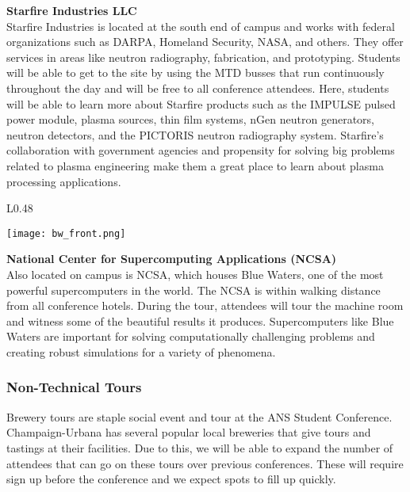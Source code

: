 \clearpage
\textbf{Starfire Industries LLC}\\
Starfire Industries is located at the south end of campus and works with federal organizations such as DARPA, Homeland Security, NASA, and others. They offer services in areas like neutron radiography, fabrication, and prototyping. Students will be able to get to the site by using the MTD busses that run continuously throughout the day and will be free to all conference attendees. Here, students will be able to learn more about Starfire products such as the IMPULSE pulsed power module, plasma sources, thin film systems, nGen neutron generators, neutron detectors, and the PICTORIS neutron radiography system. Starfire’s collaboration with government agencies and propensity for solving big problems related to plasma engineering make them a great place to learn about plasma processing applications.\\

\setlength\intextsep{0pt}
\begin{wrapfigure}{L}{0.48\textwidth}
	\begin{center}
		\texttt{[image: bw\_front.png]}
	\end{center}
\end{wrapfigure}
\textbf{National Center for Supercomputing Applications (NCSA)}\\
Also located on campus is NCSA, which houses Blue Waters, one of the most powerful supercomputers in the world. The NCSA is within walking distance from all conference hotels. During the tour, attendees will tour the machine room and witness some of the beautiful results it produces. Supercomputers like Blue Waters are important for solving computationally challenging problems and creating robust simulations for a variety of phenomena.\\

\subsubsection{Non-Technical Tours}



Brewery tours are staple social event and tour at the ANS Student Conference. Champaign-Urbana has several popular local breweries that give tours and tastings at their facilities. Due to this, we will be able to expand the number of attendees that can go on these tours over previous conferences. These will require sign up before the conference and we expect spots to fill up quickly.\\


